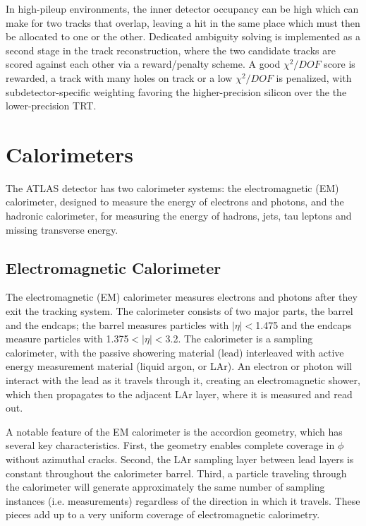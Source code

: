 In high-pileup environments, the inner detector occupancy can be high which can make for two tracks that overlap, leaving a hit in the same place which must then be allocated to one or the other.  Dedicated ambiguity solving is implemented as a second stage in the track reconstruction, where the two candidate tracks are scored against each other via a reward/penalty scheme.  A good $\chi^2/DOF$ score is rewarded, a track with many holes on track or a low $\chi^2/DOF$ is penalized, with subdetector-specific weighting favoring the higher-precision silicon over the the lower-precision TRT. 


\section{Calorimeters}
The ATLAS detector has two calorimeter systems: the electromagnetic (EM) calorimeter, designed to measure the energy of electrons and photons, and the hadronic calorimeter, for measuring the energy of hadrons, jets, tau leptons and missing transverse energy.  

\subsection{Electromagnetic Calorimeter}
\label{sec:em_cal}
The electromagnetic (EM) calorimeter measures electrons and photons after they exit the tracking system.  The calorimeter consists of two major parts, the barrel and the endcaps; the barrel measures particles with $|\eta|<$1.475 and the endcaps measure particles with 1.375$<|\eta|<$3.2.  The calorimeter is a sampling calorimeter, with the passive showering material (lead) interleaved with active energy measurement material (liquid argon, or LAr).  An electron or photon will interact with the lead as it travels through it, creating an electromagnetic shower, which then propagates to the adjacent LAr layer, where it is measured and read out.

A notable feature of the EM calorimeter is the accordion geometry, which has several key characteristics.  First, the geometry enables complete coverage in $\phi$ without azimuthal cracks.  Second, the LAr sampling layer between lead layers is constant throughout the calorimeter barrel.  Third, a particle traveling through the calorimeter will generate approximately the same number of sampling instances (i.e. measurements) regardless of the direction in which it travels.  These pieces add up to a very uniform coverage of electromagnetic calorimetry.

